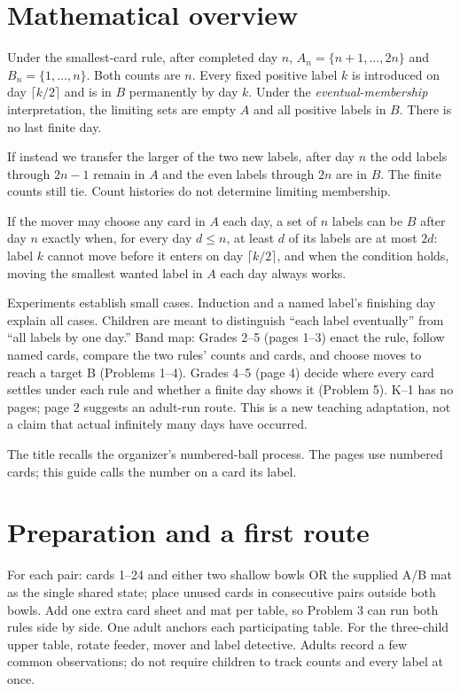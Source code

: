 \documentclass[11pt,letterpaper]{article}
\begin{document}
\section*{Mathematical overview}
Under the smallest-card rule, after completed day $n$, $A_n=\{n+1,\ldots,2n\}$ and $B_n=\{1,\ldots,n\}$. Both counts are $n$. Every fixed positive label $k$ is introduced on day $\lceil k/2\rceil$ and is in $B$ permanently by day $k$. Under the \emph{eventual-membership} interpretation, the limiting sets are empty $A$ and all positive labels in $B$. There is no last finite day.

If instead we transfer the larger of the two new labels, after day $n$ the odd labels through $2n-1$ remain in $A$ and the even labels through $2n$ are in $B$. The finite counts still tie. Count histories do not determine limiting membership.

If the mover may choose any card in $A$ each day, a set of $n$ labels can be $B$ after day $n$ exactly when, for every day $d\le n$, at least $d$ of its labels are at most $2d$: label $k$ cannot move before it enters on day $\lceil k/2\rceil$, and when the condition holds, moving the smallest wanted label in $A$ each day always works.

Experiments establish small cases. Induction and a named label's finishing day explain all cases. Children are meant to distinguish ``each label eventually'' from ``all labels by one day.'' Band map: Grades 2--5 (pages 1--3) enact the rule, follow named cards, compare the two rules' counts and cards, and choose moves to reach a target B (Problems 1--4). Grades 4--5 (page 4) decide where every card settles under each rule and whether a finite day shows it (Problem 5). K--1 has no pages; page 2 suggests an adult-run route. This is a new teaching adaptation, not a claim that actual infinitely many days have occurred.

The title recalls the organizer's numbered-ball process. The pages use numbered cards; this guide calls the number on a card its label.
\newpage
\section*{Preparation and a first route}
For each pair: cards 1--24 and either two shallow bowls OR the supplied A/B mat as the single shared state; place unused cards in consecutive pairs outside both bowls. Add one extra card sheet and mat per table, so Problem 3 can run both rules side by side. One adult anchors each participating table. For the three-child upper table, rotate feeder, mover and label detective. Adults record a few common observations; do not require children to track counts and every label at once.
\end{document}
